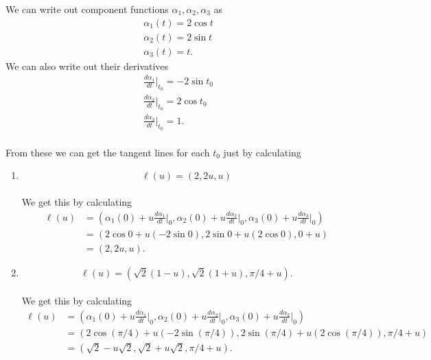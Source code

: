 \documentclass[12 pt, letterpaper]{hmcpset}
\begin{document}
\begin{solution}
	We can write out component functions $\alpha_1, \alpha_2, \alpha_3$ as
	\[
		\begin{gathered}
			\alpha_1(t) = 2 \cos t \\
			\alpha_2(t) = 2 \sin t \\
			\alpha_3(t) = t.
		\end{gathered}
	\]
	We can also write out their derivatives
	\[
		\begin{gathered}
			\frac{d \alpha_1}{dt} \Big |_{t_0} = - 2 \sin t_0 \\
			\frac{d \alpha_2}{dt} \Big |_{t_0} = 2 \cos t_0 \\
			\frac{d \alpha_3}{dt} \Big |_{t_0} = 1.
		\end{gathered}
	\] \\
	From these we can get the tangent lines for each $t_0$ just by calculating
	\begin{enumerate}
		\item
			\[
				\boxed{
					\ell(u) = (2, 2 u, u)
				}
			\] \\
			We get this by calculating
			\[
				\begin{split}
					\ell(u) & = \left ( \alpha_1(0) + u \frac{d \alpha_1}{dt} \Big |_0, \alpha_2(0) + u \frac{d \alpha_2}{dt} \Big |_0, \alpha_3(0) + u \frac{d \alpha_3}{dt} \Big |_0 \right ) \\
						& = ( 2 \cos 0 + u (-2 \sin 0), 2 \sin 0 + u (2 \cos 0), 0 + u) \\
						& = (2, 2u, u).
				\end{split}
			\]
		\item
			\[
				\boxed{
					\ell(u) = (\sqrt 2 (1 - u), \sqrt 2 (1 + u), \pi/4 + u).
				}
			\] \\
			We get this by calculating
			\[
				\begin{split}
					\ell(u) & = \left ( \alpha_1(0) + u \frac{d \alpha_1}{dt} \Big |_0, \alpha_2(0) + u \frac{d \alpha_2}{dt} \Big |_0, \alpha_3(0) + u \frac{d \alpha_3}{dt} \Big |_0 \right ) \\
						& = ( 2 \cos (\pi/4) + u (-2 \sin (\pi/4)), 2 \sin (\pi/4) + u (2 \cos (\pi/4)), \pi/4 + u) \\
						& = (\sqrt 2 - u \sqrt 2, \sqrt 2 + u \sqrt 2, \pi/4 + u).
				\end{split}
			\]
	\end{enumerate}
\end{solution}

\pagebreak
\end{document}
